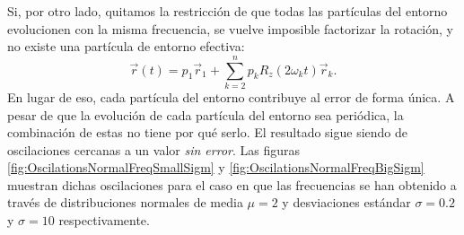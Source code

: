 Si, por otro lado, quitamos la restricción de que todas las partículas del entorno evolucionen con la misma frecuencia, se vuelve imposible factorizar la rotación, y no existe una partícula de entorno efectiva:
\begin{equation*}
    \vec{r}(t)=p_{1}\vec{r}_{1}+\sum_{k=2}^{n} p_{k}R_{z}(2\omega_{k} t)\vec{r}_{k}.
\end{equation*}
En lugar de eso, cada partícula del entorno contribuye al error de forma única. A pesar de que la evolución de cada partícula del entorno sea periódica, la combinación de estas no tiene por qué serlo. El resultado sigue siendo de oscilaciones cercanas a un valor \textit{sin error}. Las figuras \ref{fig:OscilationsNormalFreqSmallSigm} y \ref{fig:OscilationsNormalFreqBigSigm} muestran dichas oscilaciones para el caso en que las frecuencias se han obtenido a través de distribuciones normales de media $\mu=2$ y desviaciones estándar $\sigma=0.2$ y $\sigma=10$ respectivamente.

